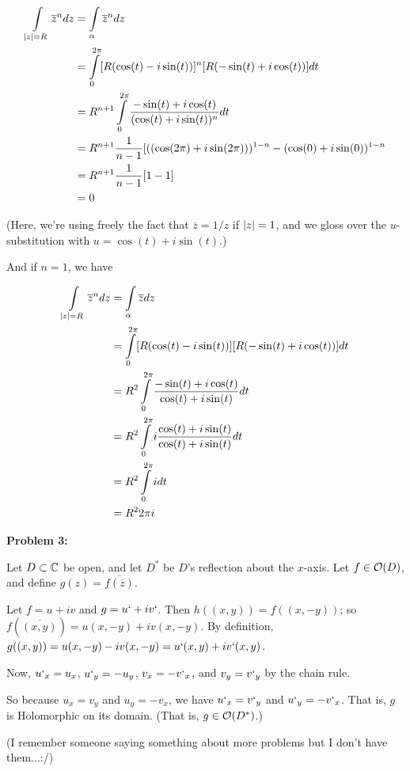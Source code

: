 \documentclass[a4paper,12pt]{article}
\begin{document}
\begin{align*}
\int\limits_{\left\lvert z \right\rvert = R} \overline{z}^n dz &= \int\limits_\alpha \overline{z}^n dz\\
&= \int\limits_0^{2\pi} [R(\cos(t) - i \sin(t))]^n [R(-\sin(t)+i\cos(t))] dt \\
&=R^{n+1}\int\limits_0^{2\pi} \frac{-\sin(t)+i\cos(t)}{(\cos(t)+i\sin(t))^n}dt\\
&= R^{n+1} \frac{1}{n-1} [((\cos(2\pi)+i\sin(2\pi)))^{1-n} - (\cos(0)+i\sin(0))^{1-n}\\
&= R^{n+1} \frac{1}{n-1} [1-1]\\
&= 0
\end{align*}

(Here, we're using freely the fact that $\overline{z} = 1/z$ if $\left\lvert z \right\rvert=1$, and we gloss over the $u$-substitution with $u = \cos(t)+i\sin(t)$.)

And if $n=1$, we have

\begin{align*}
\int\limits_{\left\lvert z \right\rvert = R} \overline{z}^n dz &= \int\limits_\alpha \overline{z} dz\\
&= \int\limits_0^{2\pi} [R(\cos(t) - i \sin(t))] [R(-\sin(t)+i\cos(t))] dt \\
&=R^{2}\int\limits_0^{2\pi} \frac{-\sin(t)+i\cos(t)}{\cos(t)+i\sin(t)}dt\\
&= R^2\int\limits_0^{2\pi} i\frac{\cos(t)+i\sin(t)}{\cos(t)+i\sin(t)}dt\\
&= R^2\int\limits_0^{2\pi} idt\\
&= R^22\pi i 
\end{align*}

\shunt

{\bf Problem 3:}

Let $D \subset \mathbb{C}$ be open, and let $D^*$ be $D$'s reflection about the $x$-axis. Let $f \in \mathcal{O} (D)$, and define $g(z) = \overline{f(\overline{z})}$.

Let $f=u+iv$ and $g= u`+iv`$. Then $h((x,y))=f((x,-y))$; so $f(\overline{(x,y)})=u(x,-y) + iv(x,-y)$. By definition, $g((x,y)) = u(x,-y) -iv(x,-y) = u`(x,y) + iv`(x,y)$.

Now, $u`_x = u_x$, $u`_y = -u_y$, $v_x = -v`_x$, and $v_y = v`_y$ by the chain rule.

So because $u_x =v_y$ and $u_y=-v_x$, we have $u`_x = v`_y$ and $u`_y=-v`_x$. That is, $g$ is Holomorphic on its domain. (That is, $g \in \mathcal{O} (D^*)$.)

\shunt

(I remember someone saying something about more problems but I don't have them...:/)
\end{document}
